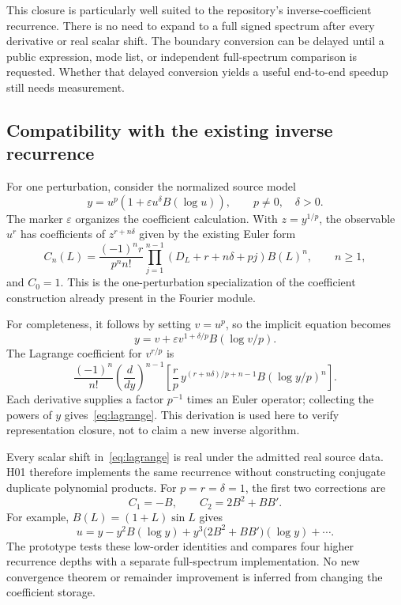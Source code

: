 \documentclass[11pt,letterpaper]{article}
\begin{document}
This closure is particularly well suited to the repository's inverse-coefficient recurrence. There is no need to expand to a full signed spectrum after every derivative or real scalar shift. The boundary conversion can be delayed until a public expression, mode list, or independent full-spectrum comparison is requested. Whether that delayed conversion yields a useful end-to-end speedup still needs measurement.

\subsection{Compatibility with the existing inverse recurrence}
For one perturbation, consider the normalized source model
\begin{equation}\label{eq:sourcefourier}
 y=u^p\left(1+\varepsilon u^\delta B(\log u)\right),
 \qquad p\ne0,\quad\delta>0.
\end{equation}
The marker \(\varepsilon\) organizes the coefficient calculation. With \(z=y^{1/p}\), the observable \(u^r\) has coefficients of \(z^{r+n\delta}\) given by the existing Euler form
\begin{equation}\label{eq:lagrange}
 C_n(L)=\frac{(-1)^n r}{p^n n!}
   \prod_{j=1}^{n-1}
   \left(D_L+r+n\delta+pj\right)B(L)^n,
 \qquad n\ge1,
\end{equation}
and \(C_0=1\). This is the one-perturbation specialization of the coefficient construction already present in the Fourier module.\cite{fourier}

For completeness, it follows by setting \(v=u^p\), so the implicit equation becomes
\[
 y=v+\varepsilon v^{1+\delta/p}B(\log v/p).
\]
The Lagrange coefficient for \(v^{r/p}\) is
\[
 \frac{(-1)^n}{n!}\left(\frac{d}{dy}\right)^{n-1}
 \left[\frac rp\,y^{(r+n\delta)/p+n-1}
 B(\log y/p)^n\right].
\]
Each derivative supplies a factor \(p^{-1}\) times an Euler operator; collecting the powers of \(y\) gives~\eqref{eq:lagrange}. This derivation is used here to verify representation closure, not to claim a new inverse algorithm.

Every scalar shift in~\eqref{eq:lagrange} is real under the admitted real source data. H01 therefore implements the same recurrence without constructing conjugate duplicate polynomial products. For \(p=r=\delta=1\), the first two corrections are
\[
 C_1=-B,\qquad C_2=2B^2+BB'.
\]
For example, \(B(L)=(1+L)\sin L\) gives
\[
 u=y-y^2B(\log y)
   +y^3\bigl(2B^2+BB'\bigr)(\log y)+\cdots.
\]
The prototype tests these low-order identities and compares four higher recurrence depths with a separate full-spectrum implementation. No new convergence theorem or remainder improvement is inferred from changing the coefficient storage.
\end{document}
